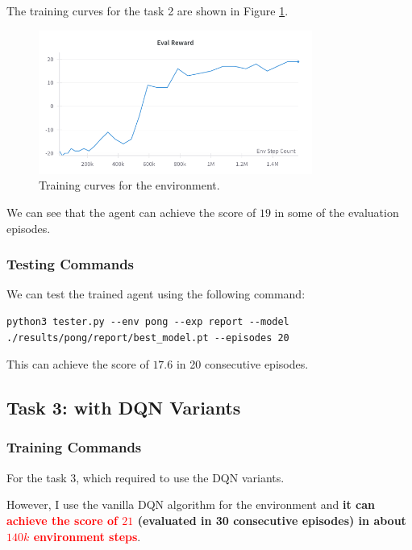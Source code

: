 The training curves for the task 2 are shown in Figure \ref{fig:pong-vanilla-training-curve}.

\begin{figure}[H]
    \centering
    \includegraphics[width=0.8\textwidth]{figures/task2.png}
    \caption{Training curves for the \pong environment.}
    \label{fig:pong-vanilla-training-curve}
\end{figure}

We can see that the agent can achieve the score of $19$ in some of the evaluation episodes.

\subsubsection{Testing Commands}

We can test the trained agent using the following command:
\begin{verbatim}
python3 tester.py --env pong --exp report --model ./results/pong/report/best_model.pt --episodes 20
\end{verbatim}
This can achieve the score of $17.6$ in 20 consecutive episodes.

\subsection{Task 3: \pong with DQN Variants}

\subsubsection{Training Commands}

For the task 3, which required to use the DQN variants.

However, I use the vanilla DQN algorithm for the \pong environment and \textbf{it can \textcolor{red}{achieve the score of $21$} (evaluated in 30 consecutive episodes) in about \textcolor{red}{$140k$ environment steps}}.

